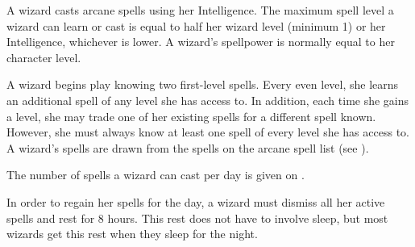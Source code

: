         A wizard casts arcane spells using her Intelligence.
        The maximum spell level a wizard can learn or cast is equal to half her wizard level (minimum 1) or her Intelligence, whichever is lower.
        A wizard's spellpower is normally equal to her character level.

        A wizard begins play knowing two first-level spells.
        Every even level, she learns an additional spell of any level she has access to.
        In addition, each time she gains a level, she may trade one of her existing spells for a different spell known.
        However, she must always know at least one spell of every level she has access to.
        A wizard's spells are drawn from the spells on the arcane spell list (see ).

        The number of spells a wizard can cast per day is given on .

        In order to regain her spells for the day, a wizard must dismiss all her active spells and rest for 8 hours.
        This rest does not have to involve sleep, but most wizards get this rest when they sleep for the night.

